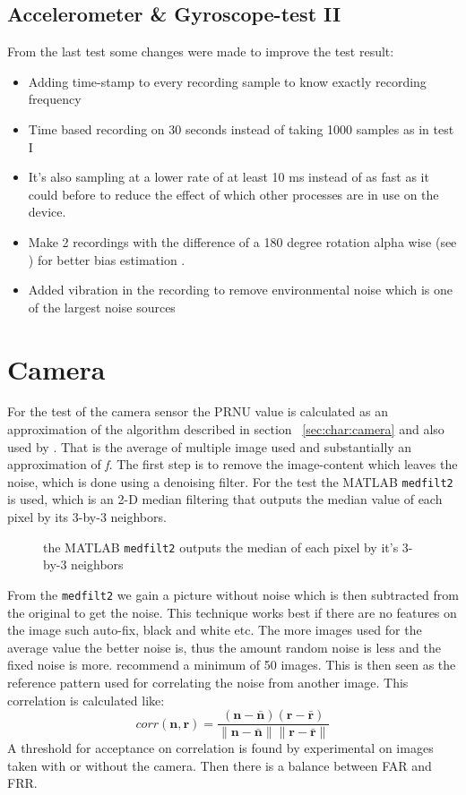 \subsection{Accelerometer \& Gyroscope-test II}
From the last test some changes were made to improve the test result:
\begin{itemize}
  \item Adding time-stamp to every recording sample to know exactly recording frequency
  \item Time based recording on 30 seconds instead of taking 1000 samples as in test I
  \item It's also sampling at a lower rate of at least 10 ms instead of as fast as it could before to reduce the effect of which other processes are in use on the device.
  \item Make 2 recordings with the difference of a 180 degree rotation alpha wise (see ) for better bias estimation \cite{acc:kionixerr}.
  \item Added vibration in the recording to remove environmental noise which is one of the largest noise sources ~\cite[p.8]{acc:kionixerr} 
\end{itemize}

\section{Camera}\label{sec:test:camera}
For the test of the camera sensor the PRNU value is calculated as an approximation of the algorithm described in section ~\ref{sec:char:camera} and also used by \cite{sensor:camera:DCIdent}. That is the average of multiple image used and substantially an approximation of \textit{f}. The first step is to remove the image-content which leaves the noise, which is done using a denoising filter. For the test the MATLAB \texttt{medfilt2} is used, which is an 2-D median filtering that outputs the median value of each pixel by its 3-by-3 neighbors. 
\begin{figure}[H]
  \centering
  
  \caption{\label{fig:pyramid} the MATLAB \texttt{medfilt2} outputs the median of each pixel by it's 3-by-3 neighbors}
\end{figure}
From the \texttt{medfilt2} we gain a picture without noise which is then subtracted from the original to get the noise. This technique works best if there are no features on the image such auto-fix, black and white etc. The more images used for the average value the better noise is, thus the amount random noise is less and the fixed noise is more. \cite{sensor:camera:DCIdent} recommend a minimum of 50 images. This is then seen as the reference pattern used for correlating the noise from another image. This correlation is calculated like:
$$
corr(\boldsymbol{n},\boldsymbol{r}) = 
\frac{(\boldsymbol{n} - \bar{\boldsymbol{n}})(\boldsymbol{r} - \bar{\boldsymbol{r}})}
{\|\boldsymbol{n} - \bar{\boldsymbol{n}}\| \|\boldsymbol{r} - \bar{\boldsymbol{r}}\|}
$$
A threshold for acceptance on correlation is found by experimental on images taken with or without the camera. Then there is a balance between FAR and FRR. 

